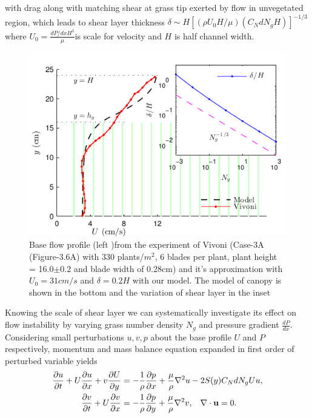 \documentclass[aps,prl,twocolumn,showpacs,superscriptaddress,groupedaddress,10pt]{revtex4-1}  %
\newcommand{\bu}{\mathbf{u}}
\newcommand{\del}{\partial}
\begin{document}
with drag along with matching shear at grass tip exerted by flow in unvegetated region, which leads to shear layer 
thickness $\delta \sim  H\left[({\rho U_0 H}/\mu) (C_N d N_g H)\right]^{-1/3}$\normalsize where \small$U_0 = \frac{dP/dxH^2}{\mu}$\normalsize is scale for velocity and
$H$ is half channel width.
\begin{figure}[htb]
  \includegraphics[scale=1]{Grass_Base_Vivoni_shear}
\caption{Base flow profile (left )from the experiment of Vivoni\cite{Vivoni98} (Case-3A (Figure-3.6A) with 330 plants/$m^2$, 6 blades per plant, 
plant height = 16.0$\pm0.2$ and blade width of 0.28cm)
 and it's approximation with $U_0=31cm/s$ and $\delta = 0.2H$ with our model. The model of canopy is shown in the bottom and the variation of shear layer in the inset }
\label{fig:basicflow}
\end{figure}
\newline
Knowing the scale of shear layer we can systematically investigate its effect on flow instability
by varying grass number density $N_g$ and pressure gradient $\frac{dP}{dx}$. Considering small perturbations $u, v, p$ about the base profile $U$ and $P$
respectively, momentum and mass balance equation expanded in first order of perturbed variable yields
\begin{equation}
\begin{split}
\frac{\del u}{\del t}+U\frac{\del u}{\del x}+v\frac{\del U}{\del y} &= -\frac{1}{\rho}\frac{\del p}{\del x}+\frac{\mu}{\rho}\nabla^2u-2S(y) C_{N}dN_{g}Uu, \\
\frac{\del v}{\del  t}+ U\frac{\del v}{\del x} &= -\frac{1}{\rho}\frac{\del p}{\del y}+\frac{\mu}{\rho}\nabla^2v, \hspace{0.3cm} \nabla\cdot\bu=0.
\end{split}
\end{equation}
\end{document}

